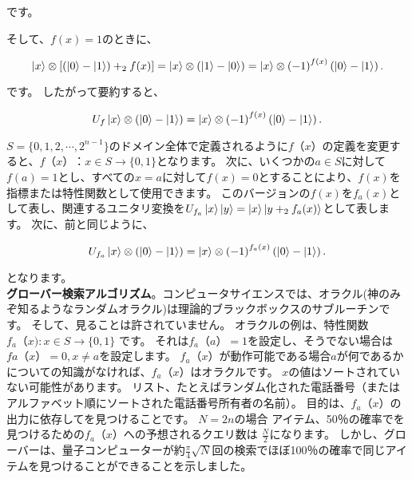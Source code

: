 です。

そして、$f(x) = 1 $のときに、

\begin{equation}
\label{72}
\ket{x} \otimes \left[ \left(  
\ket{0} - \ket{1} \right) 
+_2 f(x)
\right]
=
\ket{x} \otimes \left( \ket{1} - \ket{0} \right)
=
\ket{x} \otimes \left( -1 \right)^{f(x)} \left( \ket{0} - \ket{1} \right).
\end{equation}

です。 したがって要約すると、

\begin{equation}
\label{73}
U_f \ket{x} \otimes \left( \ket{0} - \ket{1} \right)
= \ket{x} \otimes \left( -1 \right)^{f(x)} \left( \ket{0} - \ket{1} \right).
\end{equation}

$S = \{0,1,2, \cdots, 2^{n-1} \}$のドメイン全体で定義されるように$f（x）$の定義を変更すると、$f（x）： x \in S  \to \{ 0,1 \}$となります。
次に、いくつかの$a \in S$に対して$f(a)= 1$とし、すべての$x = a$に対して$f(x)= 0$とすることにより、$f(x)$を指標または特性関数として使用できます。
このバージョンの$f(x)$を$f_a (x)$として表し、関連するユニタリ変換を$U_{f_a} \ket{x} \ket{y} = \ket{x} \ket{y +_2 f_a (x)}$として表します。 次に、前と同じように、

\begin{equation}
\label{74}
U_{f_a} \ket{x} \otimes \left( \ket{0} - \ket{1} \right)
= \ket{x} \otimes \left( -1 \right)^{f_a (x)} \left( \ket{0} - \ket{1} \right).
\end{equation}

となります。\\

\textbf{グローバー検索アルゴリズム}。コンピュータサイエンスでは、オラクル(神のみぞ知るようなランダムオラクル)は理論的ブラックボックスのサブルーチンです。
そして、見ることは許されていません。 オラクルの例は、特性関数$f_a（x) : x \in S \to \{ 0,1 \}$ です。 それは$f_a（a）= 1$を設定し、そうでない場合は$fa（x）= 0, x \ne a$を設定します。 $f_a（x）$が動作可能である場合$a$が何であるかについての知識がなければ、$f_a（x）$はオラクルです。 $x$の値はソートされていない可能性があります。
リスト、たとえばランダム化された電話番号（またはアルファベット順にソートされた電話番号所有者の名前）。 目的は、$f_a（x）$の出力に依存してを見つけることです。 $N = 2n$の場合
アイテム、50％の確率でを見つけるための$f_a（x）$への予想されるクエリ数は
$\frac{N}{2}$になります。 しかし、グローバーは、量子コンピューターが約$\frac{\pi}{4} \sqrt{N}$回の検索でほぼ100％の確率で同じアイテムを見つけることができることを示しました。

